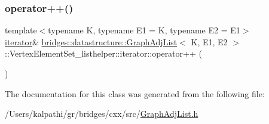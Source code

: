 \subsubsection{\texorpdfstring{operator++()}{operator++()}}
{\footnotesize\ttfamily template$<$typename K, typename E1 = K, typename E2 = E1$>$ \\
\mbox{\hyperlink{classbridges_1_1datastructure_1_1_graph_adj_list_1_1_vertex_element_set__listhelper_1_1iterator}{iterator}}\& \mbox{\hyperlink{classbridges_1_1datastructure_1_1_graph_adj_list}{bridges\+::datastructure\+::\+Graph\+Adj\+List}}$<$ K, E1, E2 $>$\+::Vertex\+Element\+Set\+\_\+listhelper\+::iterator\+::operator++ (\begin{DoxyParamCaption}{ }\end{DoxyParamCaption})\hspace{0.3cm}{\ttfamily [inline]}}



The documentation for this class was generated from the following file\+:\begin{DoxyCompactItemize}
\item 
/\+Users/kalpathi/gr/bridges/cxx/src/\mbox{\hyperlink{_graph_adj_list_8h}{Graph\+Adj\+List.\+h}}\end{DoxyCompactItemize}
